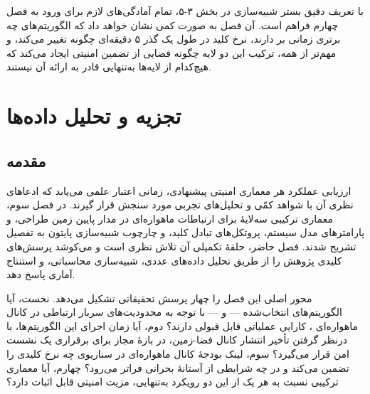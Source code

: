 \documentclass[a4paper,14pt]{extreport}
\begin{document}
با تعریف دقیق بستر شبیه‌سازی در بخش ۳-۵، تمام آمادگی‌های لازم برای ورود به فصل چهارم فراهم است. آن فصل به صورت کمی نشان خواهد داد که الگوریتم‌های  چه برتری زمانی بر  دارند، نرخ کلید  در طول یک گذر ۵ دقیقه‌ای چگونه تغییر می‌کند، و مهم‌تر از همه، ترکیب این دو لایه چگونه فضایی از تضمین امنیتی ایجاد می‌کند که هیچ‌کدام از لایه‌ها به‌تنهایی قادر به ارائه آن نیستند.


\chapter{تجزیه و تحلیل داده‌ها}
\setcounter{figure}{0}
\setcounter{table}{0}
\setcounter{equation}{0}

\section{مقدمه}

ارزیابی عملکرد هر معماری امنیتی پیشنهادی، زمانی اعتبار علمی می‌یابد که ادعاهای نظری آن با شواهد کمّی و تحلیل‌های تجربی مورد سنجش قرار گیرند. در فصل سوم، معماری ترکیبی سه‌لایهٔ  برای ارتباطات ماهواره‌ای در مدار پایین زمین  طراحی، و پارامترهای مدل سیستم، پروتکل‌های تبادل کلید، و چارچوب شبیه‌سازی پایتون  به تفصیل تشریح شدند. فصل حاضر، حلقهٔ تکمیلی آن تلاش نظری است و می‌کوشد پرسش‌های کلیدی پژوهش را از طریق تحلیل داده‌های عددی، شبیه‌سازی محاسباتی، و استنتاج آماری پاسخ دهد.

محور اصلی این فصل را چهار پرسش تحقیقاتی تشکیل می‌دهد. نخست، آیا الگوریتم‌های  انتخاب‌شده ---  و  --- با توجه به محدودیت‌های سربار ارتباطی  در کانال ماهواره‌ای ، کارایی عملیاتی قابل قبولی دارند؟ دوم، آیا زمان اجرای این الگوریتم‌ها، با درنظر گرفتن تأخیر انتشار  کانال فضا-زمین، در بازهٔ مجاز برای برقراری یک نشست امن قرار می‌گیرد؟ سوم، لینک بودجهٔ  کانال  ماهواره‌ای در سناریوی  چه نرخ کلیدی را تضمین می‌کند و  در چه شرایطی از آستانهٔ بحرانی فراتر می‌رود؟ چهارم، آیا معماری ترکیبی  نسبت به هر یک از این دو رویکرد به‌تنهایی، مزیت امنیتی قابل اثبات دارد؟
\end{document}
